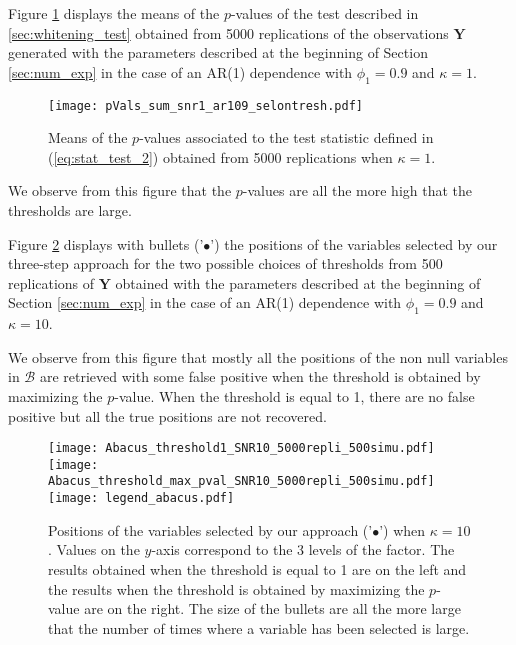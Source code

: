 Figure \ref{fig:pval_simul} displays the means of the $p$-values of
the test described in \ref{sec:whitening_test} obtained from 5000 replications of the observations $\boldsymbol{Y}$
generated with the parameters described
at the beginning of Section \ref{sec:num_exp} in the case of an AR(1)
dependence with $\phi_1=0.9$ and $\kappa=1$. 
\begin{figure}[htbp!]
\centering
\texttt{[image: pVals\_sum\_snr1\_ar109\_selontresh.pdf]}
\caption{Means of the $p$-values associated to the test statistic defined in (\ref{eq:stat_test_2}) obtained
  from 5000 replications when $\kappa=1$. 
\label{fig:pval_simul}}
\end{figure}

We observe
from this figure that the $p$-values are all the more high that the
thresholds are large. 

Figure   \ref{fig:boulier_simuls}  displays   with  bullets
('$\bullet$')  the   positions  of  the  variables   selected  by  our
three-step approach  for the two  possible choices of  thresholds from
500 replications of $\boldsymbol{Y}$  obtained  with   the  parameters
described at the beginning of Section \ref{sec:num_exp} in the case of
an  AR(1) dependence  with $\phi_1=0.9$  and $\kappa=10$.

   We observe
from  this figure  that  mostly  all the  positions  of  the non  null
variables in $\mathcal{B}$ are retrieved with some false positive when
the  threshold  is obtained  by  maximizing  the $p$-value.  When the
threshold is equal to 1, there are  no false positive but all the true
positions are not recovered.


\begin{figure}[!htbp!]
\centering
\texttt{[image: Abacus\_threshold1\_SNR10\_5000repli\_500simu.pdf]}%
\texttt{[image: Abacus\_threshold\_max\_pval\_SNR10\_5000repli\_500simu.pdf]}
\texttt{[image: legend\_abacus.pdf]}
\caption{Positions of the variables selected by our
  approach  ('$\bullet$') when  $\kappa=10$.  Values  on the  $y$-axis
  correspond to the 3 levels
  of the factor. The results obtained when the threshold
  is equal to 1 are on the left and the results when the threshold is
  obtained by maximizing the $p$-value are on the right. The size
  of the bullets are all the more large that 
  the number of times where a variable has been selected is large.
\label{fig:boulier_simuls}}
\end{figure}


